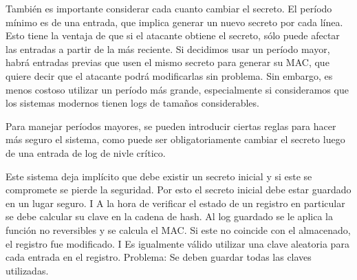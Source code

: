 También es importante considerar cada cuanto cambiar el secreto. El período mínimo es de una entrada, que implica generar un nuevo secreto por cada línea. Esto tiene la ventaja de que si el atacante obtiene el secreto, sólo puede afectar las entradas a partir de la más reciente. Si decidimos usar un período mayor, habrá entradas previas que usen el mismo secreto para generar su MAC, que quiere decir que el atacante podrá modificarlas sin problema. Sin embargo, es menos costoso utilizar un período más grande, especialmente si consideramos que los sistemas modernos tienen logs de tamaños considerables.

Para manejar períodos mayores, se pueden introducir ciertas reglas para hacer más seguro el sistema, como puede ser obligatoriamente cambiar el secreto luego de una entrada de log de nivle crítico.


Este sistema deja implícito que debe existir un secreto inicial y si
este se compromete se pierde la seguridad. Por esto el secreto inicial
debe estar guardado en un lugar seguro.
I A la hora de verificar el estado de un registro en particular se debe
calcular su clave en la cadena de hash. Al log guardado se le aplica
la función no reversibles y se calcula el MAC. Si este no coincide con
el almacenado, el registro fue modificado.
I Es igualmente válido utilizar una clave aleatoria para cada entrada en
el registro. Problema: Se deben guardar todas las claves utilizadas.